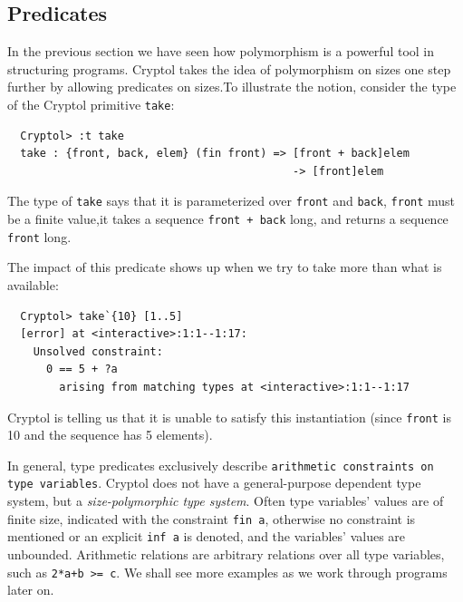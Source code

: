 \subsection{Predicates}
\label{sec:predicates}


In the previous section we have seen how polymorphism is a powerful
tool in structuring programs. Cryptol takes the idea of polymorphism
on sizes one step further by allowing predicates on
sizes.\indPredicates To illustrate the notion, consider the type of
the Cryptol primitive {\tt take}\indTake:
\begin{Verbatim}
  Cryptol> :t take
  take : {front, back, elem} (fin front) => [front + back]elem 
                                            -> [front]elem
\end{Verbatim}

The type of {\tt take} says that it is parameterized over {\tt front}
and {\tt back}, {\tt front} must be a finite value,\indFin it takes a
sequence {\tt front + back} long, and returns a sequence {\tt front} long.

The impact of this predicate shows up when we try to take more than
what is available:
\begin{Verbatim}
  Cryptol> take`{10} [1..5]
  [error] at <interactive>:1:1--1:17:
    Unsolved constraint:
      0 == 5 + ?a
        arising from matching types at <interactive>:1:1--1:17
\end{Verbatim}
Cryptol is telling us that it is unable to satisfy this instantiation
(since {\tt front} is 10 and the sequence has 5
elements).\indTake\indPredicates

In general, type predicates exclusively describe \texttt{arithmetic
  constraints on type variables}.  Cryptol does not have a
general-purpose dependent type system, but a \emph{size-polymorphic
  type system}.  Often type variables' values are of finite size,
indicated with the constraint {\tt fin a}\indFin, otherwise no
constraint is mentioned or an explicit \texttt{inf a} is
denoted\indInf, and the variables' values are unbounded.  Arithmetic
relations are arbitrary relations over all type variables, such as
{\tt 2*a+b >= c}.  We shall see more examples as we work through
programs later on.

